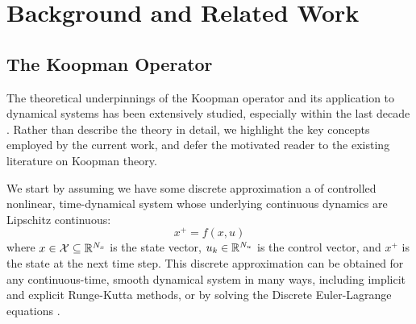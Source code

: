 \documentclass{article}
\begin{document}
\section{Background and Related Work} \label{sec:Preliminaries/Background}

  \subsection{The Koopman Operator}
  The theoretical underpinnings of the Koopman operator and its application to dynamical
  systems has been extensively studied, especially within the last decade 
  \cite{Fasel2021,Proctor2018,Bruder2021,Williams2015}. Rather than describe the theory in
  detail, we highlight the key concepts employed by the current work, and defer the
  motivated reader to the existing literature on Koopman theory.

  We start by assuming we have some discrete approximation a of controlled nonlinear,
  time-dynamical system whose underlying continuous dynamics are Lipschitz continuous:
  \begin{equation} \label{eq:discrete_dynamics} 
    x^+ = f(x, u) 
  \end{equation} 
  where $x \in \mathcal{X} \subseteq \mathbb{R}^{N_x}$ is the state vector, $u_k \in \mathbb{R}^{N_u}$ is
  the control vector, and $x^+$ is the state at the next time step. This discrete
  approximation can be obtained for any continuous-time, smooth dynamical system in many
  ways, including implicit and explicit Runge-Kutta methods, or by solving the Discrete
  Euler-Lagrange equations \cite{Brudigam2021a,Brudigam2021,Howell2022}.
\end{document}
